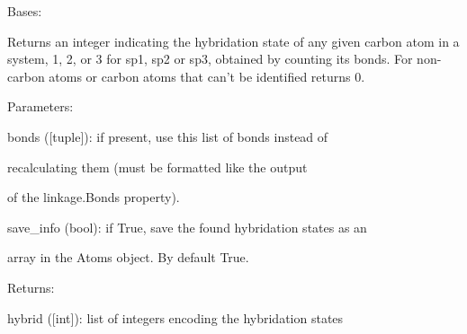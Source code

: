 \documentclass[letterpaper,10pt,english]{sphinxmanual}
\begin{document}
\begin{fulllineitems}
\label{doctree/soprano.properties.labeling.labeling:soprano.properties.labeling.labeling.CarbonHybridationState}
Bases: {\hyperref[doctree/soprano.properties.atomsproperty:soprano.properties.atomsproperty.AtomsProperty]{}}

Returns an integer indicating the hybridation state of any given carbon
atom in a system, 1, 2, or 3 for sp1, sp2 or sp3, obtained by counting its
bonds. For non-carbon atoms or carbon atoms that can't be identified
returns 0.

\begin{DUlineblock}{0em}
\item[] Parameters:
\item[]
\begin{DUlineblock}{\DUlineblockindent}
\item[] bonds ({[}tuple{]}): if present, use this list of bonds instead of
\item[]
\begin{DUlineblock}{\DUlineblockindent}
\item[] recalculating them (must be formatted like the output
\item[] of the linkage.Bonds property).
\end{DUlineblock}
\item[] save\_info (bool): if True, save the found hybridation states as an
\item[]
\begin{DUlineblock}{\DUlineblockindent}
\item[] array in the Atoms object. By default True.
\end{DUlineblock}
\end{DUlineblock}
\end{DUlineblock}

\begin{DUlineblock}{0em}
\item[] Returns:
\item[]
\begin{DUlineblock}{\DUlineblockindent}
\item[] hybrid ({[}int{]}): list of integers encoding the hybridation states
\end{DUlineblock}
\end{DUlineblock}


\end{fulllineitems}
\end{document}
